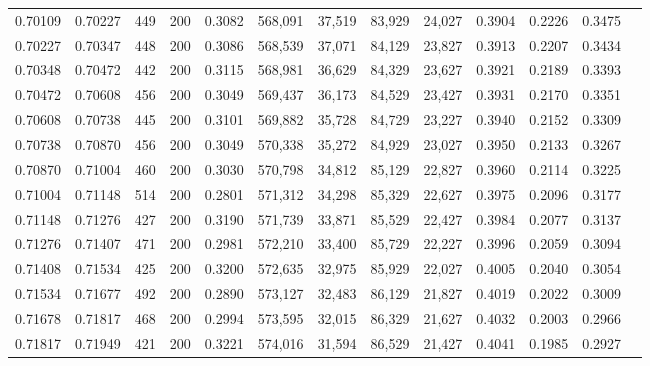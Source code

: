 \begin{tabular}{rrrrrrrrrrrrr}
0.70109 & 0.70227 &   449 & 200 &                                     0.3082 & 568,091 &  37,519 &  83,929 &  24,027 & 0.3904 & 0.2226 & 0.3475 \\
0.70227 & 0.70347 &   448 & 200 &                                     0.3086 & 568,539 &  37,071 &  84,129 &  23,827 & 0.3913 & 0.2207 & 0.3434 \\
0.70348 & 0.70472 &   442 & 200 &                                     0.3115 & 568,981 &  36,629 &  84,329 &  23,627 & 0.3921 & 0.2189 & 0.3393 \\
0.70472 & 0.70608 &   456 & 200 &                                     0.3049 & 569,437 &  36,173 &  84,529 &  23,427 & 0.3931 & 0.2170 & 0.3351 \\
0.70608 & 0.70738 &   445 & 200 &                                     0.3101 & 569,882 &  35,728 &  84,729 &  23,227 & 0.3940 & 0.2152 & 0.3309 \\
0.70738 & 0.70870 &   456 & 200 &                                     0.3049 & 570,338 &  35,272 &  84,929 &  23,027 & 0.3950 & 0.2133 & 0.3267 \\
0.70870 & 0.71004 &   460 & 200 &                                     0.3030 & 570,798 &  34,812 &  85,129 &  22,827 & 0.3960 & 0.2114 & 0.3225 \\
0.71004 & 0.71148 &   514 & 200 &                                     0.2801 & 571,312 &  34,298 &  85,329 &  22,627 & 0.3975 & 0.2096 & 0.3177 \\
0.71148 & 0.71276 &   427 & 200 &                                     0.3190 & 571,739 &  33,871 &  85,529 &  22,427 & 0.3984 & 0.2077 & 0.3137 \\
0.71276 & 0.71407 &   471 & 200 &                                     0.2981 & 572,210 &  33,400 &  85,729 &  22,227 & 0.3996 & 0.2059 & 0.3094 \\
0.71408 & 0.71534 &   425 & 200 &                                     0.3200 & 572,635 &  32,975 &  85,929 &  22,027 & 0.4005 & 0.2040 & 0.3054 \\
0.71534 & 0.71677 &   492 & 200 &                                     0.2890 & 573,127 &  32,483 &  86,129 &  21,827 & 0.4019 & 0.2022 & 0.3009 \\
0.71678 & 0.71817 &   468 & 200 &                                     0.2994 & 573,595 &  32,015 &  86,329 &  21,627 & 0.4032 & 0.2003 & 0.2966 \\
0.71817 & 0.71949 &   421 & 200 &                                     0.3221 & 574,016 &  31,594 &  86,529 &  21,427 & 0.4041 & 0.1985 & 0.2927 \\

\end{tabular}
